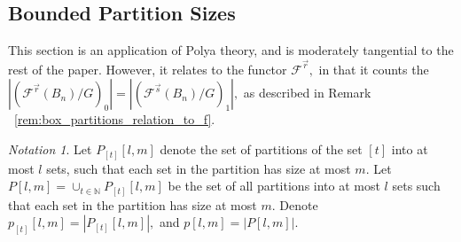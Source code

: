 \documentclass{amsart}
\theoremstyle{remark}
\newtheorem{note}[thm]{Notation}
\newcommand\ssec{\subsection}
\newcommand\BN{{\mathbb N}}
\renewcommand{\vec}[1]{\overrightarrow{#1}}
\begin{document}
\ssec{Bounded Partition Sizes}
This section is an application of Polya theory, and is moderately tangential to the rest of the paper. However, it relates to the functor $\mathcal F^{\vec r},$ in that it counts the $|(\mathcal F^{\vec r}(B_n)/G)_0| =  |(\mathcal F^{\vec s}(B_n)/G)_1|,$ as described in Remark ~\ref{rem:box_partitions_relation_to_f}.

\begin{note}
Let $P_{[t]}[l,m]$ denote the set of partitions of the set $[t]$ into at most $l$ sets, such that each set in the partition has size at most $m.$ Let $P[l,m] = \cup_{t \in \BN} P_{[t]}[l,m]$ be the set of all partitions into at most $l$ sets such that each set in the partition has size at most $m.$ Denote $p_{[t]}[l,m] = |P_{[t]}[l,m]|,$ and $p[l,m] = |P[l,m]|.$
\end{note}
\end{document}

